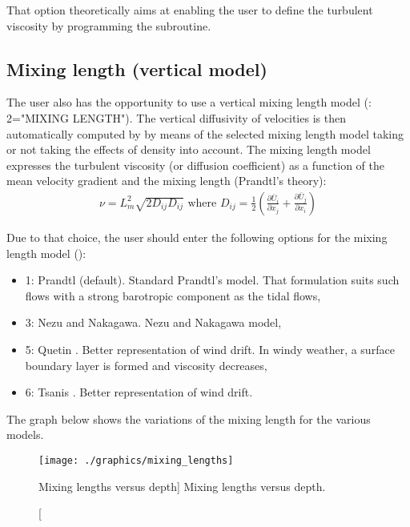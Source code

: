 That option theoretically aims at enabling the user to define the turbulent
viscosity by programming the   subroutine.

\subsection{Mixing length (vertical model)}

The user also has the opportunity to use a vertical mixing length model
(: 2="MIXING LENGTH"). The vertical
diffusivity of velocities is then automatically computed by  by means
of the selected mixing length model taking or not taking the effects of density
into account. The mixing length model expresses the turbulent viscosity (or
diffusion coefficient) as a function of the mean velocity gradient and the
mixing length (Prandtl's theory):
\begin{align}
\nu =L_{m}^{2} \sqrt{2D_{ij} D_{ij}} \textrm{ where }  D_{ij} =\frac{1}{2}
\left(\frac{\partial \bar{U}_{i} }{\partial x_{j} }
      +\frac{\partial \bar{U}_{j}}{\partial x_{i} } \right)
\end{align}

Due to that choice, the user should enter the following options for the mixing
length model ():

\begin{itemize}
\item  1: Prandtl (default). Standard Prandtl's model. That formulation suits
such flows with a strong barotropic component as the tidal flows,

\item  3: Nezu and Nakagawa. Nezu and Nakagawa model,

\item  5: Quetin \cite{Quetin1977}. Better representation of wind drift.
In windy weather, a surface boundary layer is formed and viscosity decreases,

\item  6: Tsanis \cite{Tsanis1989}. Better representation of wind drift.
\end{itemize}

The graph below shows the variations of the mixing length for the various models.

\begin{figure}[H]%
\begin{center}
%
  \texttt{[image: ./graphics/mixing\_lengths]}
%
\end{center}
\caption
[Mixing lengths versus depth]
{Mixing lengths versus depth.}
\label{fig:mix_len}
\end{figure}


